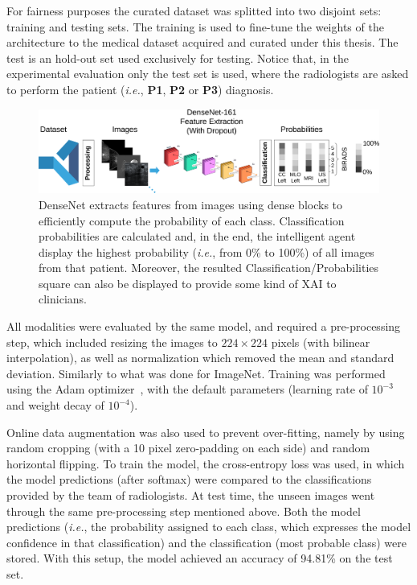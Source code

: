 For fairness purposes the curated dataset was splitted into two disjoint sets: training and testing sets.
The training is used to fine-tune the weights of the architecture to the medical dataset acquired and curated under this thesis.
The test is an hold-out set used exclusively for testing.
Notice that, in the experimental evaluation only the test set is used, where the radiologists are asked to perform the patient ({\it i.e.}, {\bf P1}, {\bf P2} or {\bf P3}) diagnosis.

\begin{figure}[htbp]
\centering
\includegraphics[width=\textwidth]{images/fig042}
\caption{DenseNet extracts features from images using dense blocks to efficiently compute the probability of each class. Classification probabilities are calculated and, in the end, the intelligent agent display the highest probability ({\it i.e.}, from 0\% to 100\%) of all images from that patient. Moreover, the resulted Classification/Probabilities square can also be displayed to provide some kind of XAI to clinicians.}
\label{fig:fig042}
\end{figure}

All modalities were evaluated by the same model, and required a pre-processing step, which included resizing the images to $224\times 224$ pixels (with bilinear interpolation), as well as normalization which removed the mean and standard deviation.
Similarly to what was done for ImageNet.
Training was performed using the Adam optimizer~\cite{kingma2014adam}, with the default parameters (learning rate of $10^{-3}$ and weight decay of $10^{-4}$).

Online data augmentation was also used to prevent over-fitting, namely by using random cropping (with a 10 pixel zero-padding on each side) and random horizontal flipping.
To train the model, the cross-entropy loss was used, in which the model predictions (after softmax) were compared to the classifications provided by the team of radiologists.
At test time, the unseen images went through the same pre-processing step mentioned above.
Both the model predictions (\textit{i.e.}, the probability assigned to each class, which expresses the model confidence in that classification) and the classification (most probable class) were stored.
With this setup, the model achieved an accuracy of 94.81\% on the test set.

